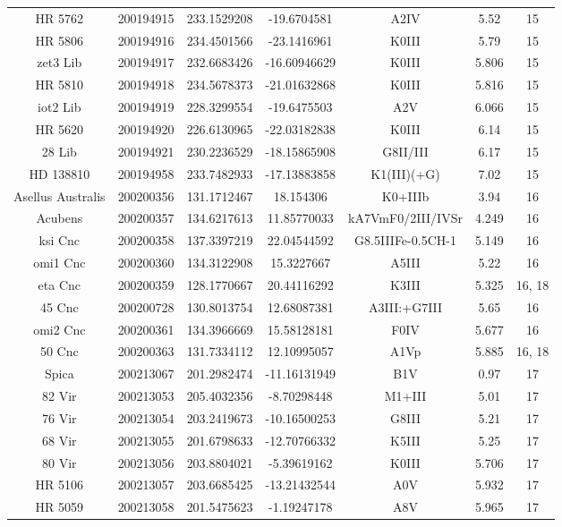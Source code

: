 \begin{table*}
\begin{tabular}{ccccccc}
HR 5762 & 200194915 & 233.1529208 & -19.6704581 & A2IV & 5.52 & 15 \\
HR 5806 & 200194916 & 234.4501566 & -23.1416961 & K0III & 5.79 & 15 \\
zet3 Lib & 200194917 & 232.6683426 & -16.60946629 & K0III & 5.806 & 15 \\
HR 5810 & 200194918 & 234.5678373 & -21.01632868 & K0III & 5.816 & 15 \\
iot2 Lib & 200194919 & 228.3299554 & -19.6475503 & A2V & 6.066 & 15 \\
HR 5620 & 200194920 & 226.6130965 & -22.03182838 & K0III & 6.14 & 15 \\
28 Lib & 200194921 & 230.2236529 & -18.15865908 & G8II/III & 6.17 & 15 \\
HD 138810 & 200194958 & 233.7482933 & -17.13883858 & K1(III)(+G) & 7.02 & 15 \\
Asellus Australis & 200200356 & 131.1712467 & 18.154306 & K0+IIIb & 3.94 & 16 \\
Acubens & 200200357 & 134.6217613 & 11.85770033 & kA7VmF0/2III/IVSr & 4.249 & 16 \\
ksi Cnc & 200200358 & 137.3397219 & 22.04544592 & G8.5IIIFe-0.5CH-1 & 5.149 & 16 \\
omi1 Cnc & 200200360 & 134.3122908 & 15.3227667 & A5III & 5.22 & 16 \\
eta Cnc & 200200359 & 128.1770667 & 20.44116292 & K3III & 5.325 & 16, 18 \\
45 Cnc & 200200728 & 130.8013754 & 12.68087381 & A3III:+G7III & 5.65 & 16 \\
omi2 Cnc & 200200361 & 134.3966669 & 15.58128181 & F0IV & 5.677 & 16 \\
50 Cnc & 200200363 & 131.7334112 & 12.10995057 & A1Vp & 5.885 & 16, 18 \\
Spica & 200213067 & 201.2982474 & -11.16131949 & B1V & 0.97 & 17 \\
82 Vir & 200213053 & 205.4032356 & -8.70298448 & M1+III & 5.01 & 17 \\
76 Vir & 200213054 & 203.2419673 & -10.16500253 & G8III & 5.21 & 17 \\
68 Vir & 200213055 & 201.6798633 & -12.70766332 & K5III & 5.25 & 17 \\
80 Vir & 200213056 & 203.8804021 & -5.39619162 & K0III & 5.706 & 17 \\
HR 5106 & 200213057 & 203.6685425 & -13.21432544 & A0V & 5.932 & 17 \\
HR 5059 & 200213058 & 201.5475623 & -1.19247178 & A8V & 5.965 & 17 \\

\end{tabular}
\end{table*}
